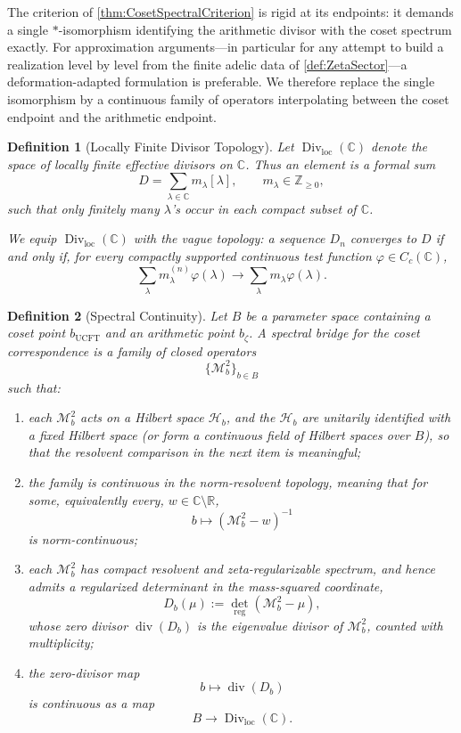 \documentclass[pdflatex,sn-mathphys-num]{sn-jnl}
\theoremstyle{thmstyleone}
\theoremstyle{thmstylethree}%
\newtheorem{definition}[definition]{Definition}
\theoremstyle{thmstyletwo}%
\begin{document}
The criterion of \autoref{thm:CosetSpectralCriterion} is rigid at its endpoints:
it demands a single $*$-isomorphism identifying the arithmetic divisor with
the coset spectrum exactly. For approximation arguments---in particular for
any attempt to build a realization level by level from the finite adelic data
of \autoref{def:ZetaSector}---a deformation-adapted formulation
is preferable. We therefore replace the single isomorphism by a
continuous family of operators interpolating between the coset endpoint and
the arithmetic endpoint.

\begin{definition}[Locally Finite Divisor Topology]
Let \(\operatorname{Div}_{\mathrm{loc}}(\mathbb C)\) denote the space of
locally finite effective divisors on \(\mathbb C\). Thus an element is a formal
sum
\[
D=\sum_{\lambda\in\mathbb C}m_{\lambda}[\lambda],
\qquad
m_{\lambda}\in\mathbb Z_{\ge0},
\]
such that only finitely many \(\lambda\)'s occur in each compact subset of
\(\mathbb C\).

We equip \(\operatorname{Div}_{\mathrm{loc}}(\mathbb C)\) with the vague
topology: a sequence \(D_n\) converges to \(D\) if and only if, for every
compactly supported continuous test function \(\varphi\in C_c(\mathbb C)\),
\[
\sum_{\lambda}m_{\lambda}^{(n)}\varphi(\lambda)
\longrightarrow
\sum_{\lambda}m_{\lambda}\varphi(\lambda).
\]
\end{definition}

\begin{definition}[Spectral Continuity]
Let \(B\) be a parameter space containing a coset point \(b_{\mathrm{UCFT}}\)
and an arithmetic point \(b_{\zeta}\). A spectral bridge for the coset
correspondence is a family of closed operators
\[
\{\mathcal M_b^2\}_{b\in B}
\]
such that:
\begin{enumerate}
\item each \(\mathcal M_b^2\) acts on a Hilbert space \(\mathcal H_b\), and
the \(\mathcal H_b\) are unitarily identified with a fixed Hilbert space
(or form a continuous field of Hilbert spaces over \(B\)), so that the
resolvent comparison in the next item is meaningful;
\item the family is continuous in the norm-resolvent topology, meaning that
for some, equivalently every, \(w\in\mathbb C\setminus\mathbb R\),
\[
b\longmapsto (\mathcal M_b^2-w)^{-1}
\]
is norm-continuous;
\item each \(\mathcal M_b^2\) has compact resolvent and zeta-regularizable
spectrum, and hence admits a regularized determinant in the
mass-squared coordinate,
\[
D_b(\mu):=\det_{\mathrm{reg}}(\mathcal M_b^2-\mu),
\]
whose zero divisor \(\operatorname{div}(D_b)\) is the eigenvalue divisor of
\(\mathcal M_b^2\), counted with multiplicity;
\item the zero-divisor map
\[
b\longmapsto \operatorname{div}(D_b)
\]
is continuous as a map
\[
B\longrightarrow \operatorname{Div}_{\mathrm{loc}}(\mathbb C).
\]
\end{enumerate}
\end{definition}
\end{document}
